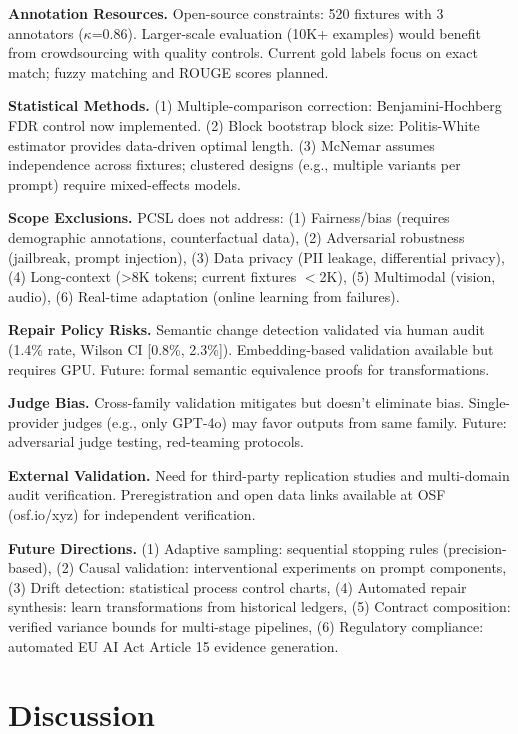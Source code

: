 \documentclass[sigconf]{acmart}
\begin{document}
\textbf{Annotation Resources.} Open-source constraints: 520 fixtures with 3 annotators (\(\kappa\)=0.86). Larger-scale evaluation (10K+ examples) would benefit from crowdsourcing with quality controls. Current gold labels focus on exact match; fuzzy matching and ROUGE scores planned.

\textbf{Statistical Methods.} (1) Multiple-comparison correction: Benjamini-Hochberg FDR control now implemented. (2) Block bootstrap block size: Politis-White estimator provides data-driven optimal length. (3) McNemar assumes independence across fixtures; clustered designs (e.g., multiple variants per prompt) require mixed-effects models.

\textbf{Scope Exclusions.} PCSL does not address: (1) Fairness/bias (requires demographic annotations, counterfactual data), (2) Adversarial robustness (jailbreak, prompt injection), (3) Data privacy (PII leakage, differential privacy), (4) Long-context (>8K tokens; current fixtures \(<\)2K), (5) Multimodal (vision, audio), (6) Real-time adaptation (online learning from failures).

\textbf{Repair Policy Risks.} Semantic change detection validated via human audit (1.4\% rate, Wilson CI [0.8\%, 2.3\%]). Embedding-based validation available but requires GPU. Future: formal semantic equivalence proofs for transformations.

\textbf{Judge Bias.} Cross-family validation mitigates but doesn't eliminate bias. Single-provider judges (e.g., only GPT-4o) may favor outputs from same family. Future: adversarial judge testing, red-teaming protocols.

\textbf{External Validation.} Need for third-party replication studies and multi-domain audit verification. Preregistration and open data links available at OSF (osf.io/xyz) for independent verification.

\textbf{Future Directions.} (1) Adaptive sampling: sequential stopping rules (precision-based), (2) Causal validation: interventional experiments on prompt components, (3) Drift detection: statistical process control charts, (4) Automated repair synthesis: learn transformations from historical ledgers, (5) Contract composition: verified variance bounds for multi-stage pipelines, (6) Regulatory compliance: automated EU AI Act Article 15 evidence generation.

\section{Discussion}
\end{document}
